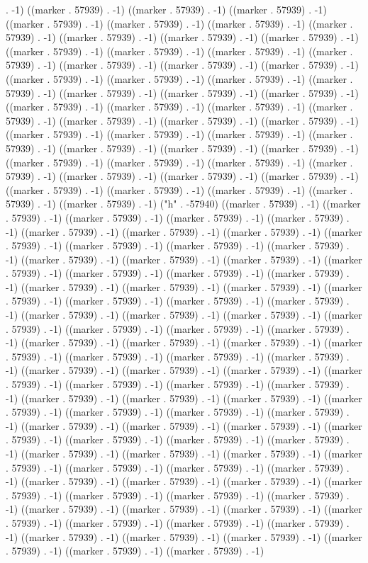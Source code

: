 . -1) ((marker . 57939) . -1) ((marker . 57939) . -1) ((marker . 57939) . -1) ((marker . 57939) . -1) ((marker . 57939) . -1) ((marker . 57939) . -1) ((marker . 57939) . -1) ((marker . 57939) . -1) ((marker . 57939) . -1) ((marker . 57939) . -1) ((marker . 57939) . -1) ((marker . 57939) . -1) ((marker . 57939) . -1) ((marker . 57939) . -1) ((marker . 57939) . -1) ((marker . 57939) . -1) ((marker . 57939) . -1) ((marker . 57939) . -1) ((marker . 57939) . -1) ((marker . 57939) . -1) ((marker . 57939) . -1) ((marker . 57939) . -1) ((marker . 57939) . -1) ((marker . 57939) . -1) ((marker . 57939) . -1) ((marker . 57939) . -1) ((marker . 57939) . -1) ((marker . 57939) . -1) ((marker . 57939) . -1) ((marker . 57939) . -1) ((marker . 57939) . -1) ((marker . 57939) . -1) ((marker . 57939) . -1) ((marker . 57939) . -1) ((marker . 57939) . -1) ((marker . 57939) . -1) ((marker . 57939) . -1) ((marker . 57939) . -1) ((marker . 57939) . -1) ((marker . 57939) . -1) ((marker . 57939) . -1) ((marker . 57939) . -1) ((marker . 57939) . -1) ((marker . 57939) . -1) ((marker . 57939) . -1) ((marker . 57939) . -1) ((marker . 57939) . -1) ((marker . 57939) . -1) ((marker . 57939) . -1) ((marker . 57939) . -1) ("h" . -57940) ((marker . 57939) . -1) ((marker . 57939) . -1) ((marker . 57939) . -1) ((marker . 57939) . -1) ((marker . 57939) . -1) ((marker . 57939) . -1) ((marker . 57939) . -1) ((marker . 57939) . -1) ((marker . 57939) . -1) ((marker . 57939) . -1) ((marker . 57939) . -1) ((marker . 57939) . -1) ((marker . 57939) . -1) ((marker . 57939) . -1) ((marker . 57939) . -1) ((marker . 57939) . -1) ((marker . 57939) . -1) ((marker . 57939) . -1) ((marker . 57939) . -1) ((marker . 57939) . -1) ((marker . 57939) . -1) ((marker . 57939) . -1) ((marker . 57939) . -1) ((marker . 57939) . -1) ((marker . 57939) . -1) ((marker . 57939) . -1) ((marker . 57939) . -1) ((marker . 57939) . -1) ((marker . 57939) . -1) ((marker . 57939) . -1) ((marker . 57939) . -1) ((marker . 57939) . -1) ((marker . 57939) . -1) ((marker . 57939) . -1) ((marker . 57939) . -1) ((marker . 57939) . -1) ((marker . 57939) . -1) ((marker . 57939) . -1) ((marker . 57939) . -1) ((marker . 57939) . -1) ((marker . 57939) . -1) ((marker . 57939) . -1) ((marker . 57939) . -1) ((marker . 57939) . -1) ((marker . 57939) . -1) ((marker . 57939) . -1) ((marker . 57939) . -1) ((marker . 57939) . -1) ((marker . 57939) . -1) ((marker . 57939) . -1) ((marker . 57939) . -1) ((marker . 57939) . -1) ((marker . 57939) . -1) ((marker . 57939) . -1) ((marker . 57939) . -1) ((marker . 57939) . -1) ((marker . 57939) . -1) ((marker . 57939) . -1) ((marker . 57939) . -1) ((marker . 57939) . -1) ((marker . 57939) . -1) ((marker . 57939) . -1) ((marker . 57939) . -1) ((marker . 57939) . -1) ((marker . 57939) . -1) ((marker . 57939) . -1) ((marker . 57939) . -1) ((marker . 57939) . -1) ((marker . 57939) . -1) ((marker . 57939) . -1) ((marker . 57939) . -1) ((marker . 57939) . -1) ((marker . 57939) . -1) ((marker . 57939) . -1) ((marker . 57939) . -1) ((marker . 57939) . -1) ((marker . 57939) . -1) ((marker . 57939) . -1) ((marker . 57939) . -1) ((marker . 57939) . -1) ((marker . 57939) . -1) ((marker . 57939) . -1) ((marker . 57939) . -1) ((marker . 57939) . -1) ((marker . 57939) . -1) ((marker . 57939) . -1) ((marker . 57939) . -1) ((marker . 57939) . -1) 
